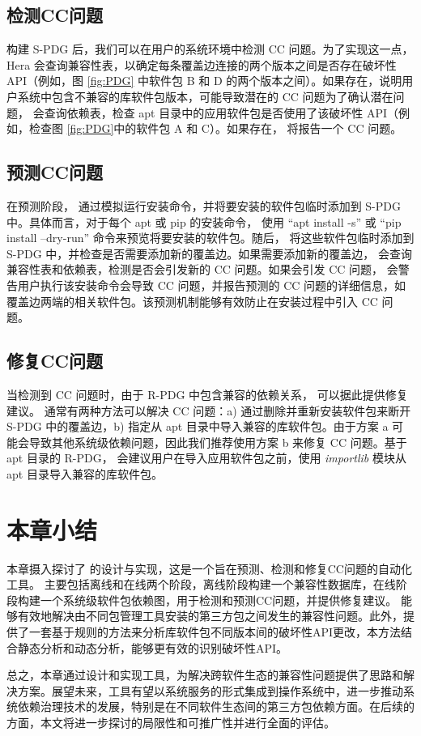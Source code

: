 \subsection{检测CC问题}\label{4.2.2}
构建 S-PDG 后，我们可以在用户的系统环境中检测 CC 问题。为了实现这一点，Hera 会查询兼容性表，以确定每条覆盖边连接的两个版本之间是否存在破坏性 API（例如，图 \ref{fig:PDG} 中软件包 B 和 D 的两个版本之间）。如果存在，说明用户系统中包含不兼容的库软件包版本，可能导致潜在的 CC 问题为了确认潜在问题，\tool{} 会查询依赖表，检查 apt 目录中的应用软件包是否使用了该破坏性 API（例如，检查图 \ref{fig:PDG}中的软件包 A 和 C）。如果存在，\tool{} 将报告一个 CC 问题。

\subsection{预测CC问题}\label{4.2.3}
在预测阶段，\tool{} 通过模拟运行安装命令，并将要安装的软件包临时添加到 S-PDG 中。具体而言，对于每个 apt 或 pip 的安装命令，\tool{} 使用 “apt install -s” 或 “pip install --dry-run” 命令来预览将要安装的软件包。随后，\tool{} 将这些软件包临时添加到 S-PDG 中，并检查是否需要添加新的覆盖边。如果需要添加新的覆盖边，\tool{} 会查询兼容性表和依赖表，检测是否会引发新的 CC 问题。如果会引发 CC 问题，\tool{} 会警告用户执行该安装命令会导致 CC 问题，并报告预测的 CC 问题的详细信息，如覆盖边两端的相关软件包。该预测机制能够有效防止在安装过程中引入 CC 问题。

\subsection{修复CC问题}\label{4.2.4}
当检测到 CC 问题时，由于 R-PDG 中包含兼容的依赖关系，\tool{} 可以据此提供修复建议。
通常有两种方法可以解决 CC 问题：a) 通过删除并重新安装软件包来断开 S-PDG 中的覆盖边，b) 指定从 apt 目录中导入兼容的库软件包。由于方案 a 可能会导致其他系统级依赖问题，因此我们推荐使用方案 b 来修复 CC 问题。基于 apt 目录的 R-PDG，\tool{} 会建议用户在导入应用软件包之前，使用 \textit{importlib} 模块从 apt 目录导入兼容的库软件包。

\section{本章小结}
本章摄入探讨了 \tool{}的设计与实现，这是一个旨在预测、检测和修复CC问题的自动化工具。 \tool{}主要包括离线和在线两个阶段，离线阶段构建一个兼容性数据库，在线阶段构建一个系统级软件包依赖图，用于检测和预测CC问题，并提供修复建议。\tool{} 能够有效地解决由不同包管理工具安装的第三方包之间发生的兼容性问题。此外，\tool{}提供了一套基于规则的方法来分析库软件包不同版本间的破坏性API更改，本方法结合静态分析和动态分析，能够更有效的识别破坏性API。

总之，本章通过设计和实现\tool{}工具，为解决跨软件生态的兼容性问题提供了思路和解决方案。展望未来，\tool{}工具有望以系统服务的形式集成到操作系统中，进一步推动系统依赖治理技术的发展，特别是在不同软件生态间的第三方包依赖方面。在后续的方面，本文将进一步探讨\tool{}的局限性和可推广性并进行全面的评估。